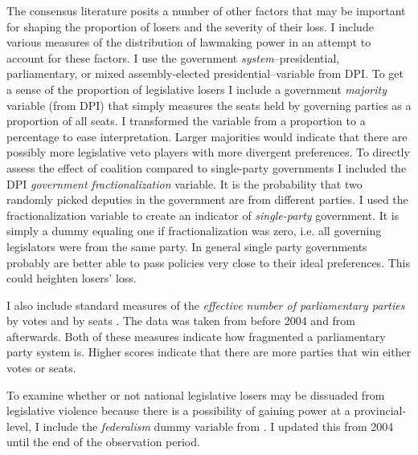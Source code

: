\documentclass[a4paper]{article}\usepackage{graphicx, color}
\begin{document}
The consensus literature posits a number of other factors that may be important for shaping the proportion of losers and the severity of their loss. I include various measures of the distribution of lawmaking power in an attempt to account for these factors. I use the government {\emph{system}}--presidential, parliamentary, or mixed assembly-elected presidential--variable from DPI. To get a sense of the proportion of legislative losers I include a government {\emph{majority}} variable (from DPI) that simply measures the seats held by governing parties as a proportion of all seats. I transformed the variable from a proportion to a percentage to ease interpretation. Larger majorities would indicate that there are possibly more legislative veto players with more divergent preferences. To directly assess the effect of coalition compared to single-party governments I included the DPI {\emph{government fractionalization}} variable. It is the probability that two randomly picked deputies in the government are from different parties. I used the fractionalization variable to create an indicator of {\emph{single-party}} government. It is simply a dummy equaling one if fractionalization was zero, i.e. all governing legislators were from the same party. In general single party governments probably are better able to pass policies very close to their ideal preferences. This could heighten losers' loss.

I also include standard measures of the \emph{effective number of parliamentary parties} by votes and by seats \citep[see][]{Laakso1979, Taagepera1989}. The data was taken from \cite{Carey2011} before 2004 and from \cite{Gallagher2012} afterwards. Both of these measures indicate how fragmented a parliamentary party system is. Higher scores indicate that there are more parties that win either votes or seats.

To examine whether or not national legislative losers may be dissuaded from legislative violence because there is a possibility of gaining power at a provincial-level, I include the \emph{federalism} dummy variable from \cite{Carey2011}. I updated this from 2004 until the end of the observation period.
\end{document}
